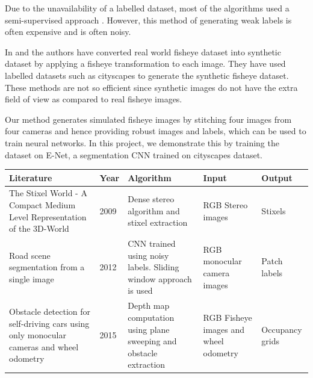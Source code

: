 \documentclass[a4paper, 12pt, oneside, BCOR1cm,toc=chapterentrywithdots]{scrbook}
\begin{document}
Due to the unavailability of a labelled dataset, most of the algorithms used a semi-supervised approach\cite{brust2015convolutional} \cite{sanberg2017free}\cite{hanisch2017free}\cite{tsutsui2018minimizing}. However, this method of generating weak labels is often expensive and is often noisy. 

In \cite{deng2018restricted} and \cite{saez2018cnn} the authors have converted real world fisheye dataset into synthetic dataset by applying a fisheye transformation to each image. They have used labelled datasets such as cityscapes \cite{Cordts2016Cityscapes} to generate the synthetic fisheye dataset. These methods are not so efficient since synthetic images do not have the extra field of view as compared to real fisheye images. 

Our method generates simulated fisheye images by stitching four images from four cameras and hence providing robust images and labels, which can be used to train neural networks. In this project, we demonstrate this by training the dataset on E-Net\cite{Paszke2017ENetAD}, a segmentation CNN trained on cityscapes dataset\cite{Cordts2016Cityscapes}. 
\begin{center}

\label{tab:table1}
\begin{tabular}{| p{5cm} | l |  p{4cm} | p{2cm} | p{2cm} |}
\hline
\textbf{Literature} & \textbf{Year} & \textbf{Algorithm} & \textbf{Input} & \textbf{Output}\\
\hline
The Stixel World - A Compact Medium Level Representation of the 3D-World \cite{badino2009stixel} & 2009 & Dense stereo algorithm and stixel extraction & RGB Stereo images & Stixels\\
\hline
Road scene segmentation from a single image \cite{alvarez2012road} & 2012 & CNN trained using noisy labels. Sliding window approach is used & RGB monocular camera images & Patch labels\\ 
\hline
Obstacle detection for self-driving cars using only monocular cameras and wheel odometry \cite{hane2015obstacle} & 2015 & Depth map computation using plane sweeping and obstacle extraction & RGB Fisheye images and wheel odometry  & Occupancy grids\\
\hline
\end{tabular}
\end{center}
\end{document}

